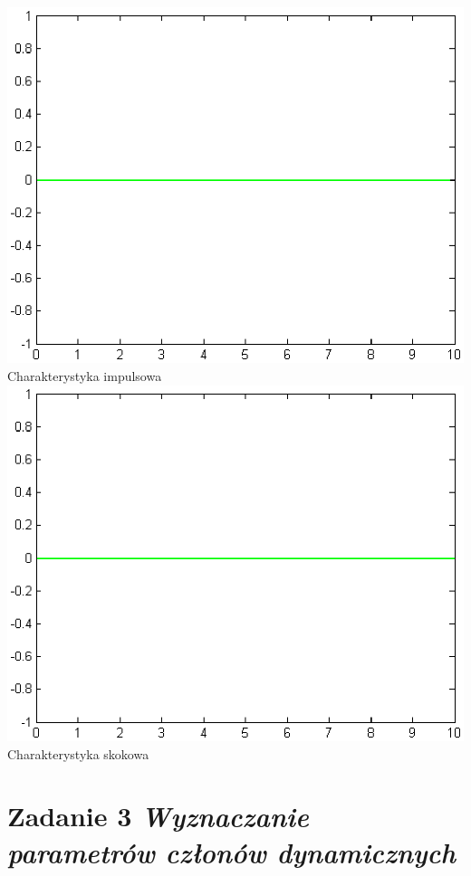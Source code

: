 \documentclass[a4paper,10pt]{article}
\begin{document}
\begin{itemize}
\begin{itemize}
\newline \includegraphics[scale=0.9]{CW1-proporcjonalny-mimpuls.eps}\newline Charakterystyka impulsowa
\newline \includegraphics[scale=0.9]{CW1-proporcjonalny-mskok.eps}\newline Charakterystyka skokowa
  
\end{itemize}
\end{itemize}

\section{Zadanie 3 \textit{\small Wyznaczanie parametrów członów dynamicznych}}\label{sec:zad3}
\end{document}
